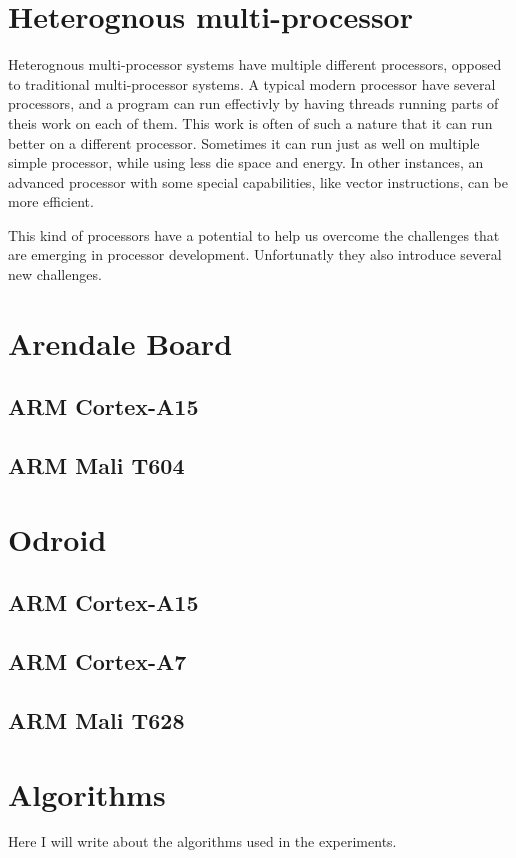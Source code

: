 \section{Heterognous multi-processor}
Heterognous multi-processor systems have multiple different processors, opposed to traditional multi-processor systems.
A typical modern processor have several processors, and a program can run effectivly by having threads running parts of theis work on each of them.
This work is often of such a nature that it can run better on a different processor.
Sometimes it can run just as well on multiple simple processor, while using less die space and energy.
In other instances, an advanced processor with some special capabilities, like vector instructions, can be more efficient.

  This kind of processors have a potential to help us overcome the challenges that are emerging in processor development.
    Unfortunatly they also introduce several new challenges.


\section{Arendale Board}
\subsection{ARM Cortex-A15}
\subsection{ARM Mali T604}

\section{Odroid}
\subsection{ARM Cortex-A15}
\subsection{ARM Cortex-A7}
\subsection{ARM Mali T628}

\section{Algorithms}
Here I will write about the algorithms used in the experiments.

